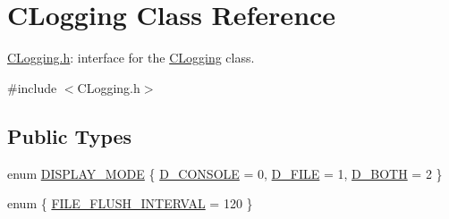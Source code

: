 \hypertarget{class_c_logging}{\section{\-C\-Logging \-Class \-Reference}
\label{class_c_logging}
}


\hyperlink{_c_logging_8h}{\-C\-Logging.\-h}\-: interface for the \hyperlink{class_c_logging}{\-C\-Logging} class.  




{\ttfamily \#include $<$\-C\-Logging.\-h$>$}

\subsection*{\-Public \-Types}
\begin{DoxyCompactItemize}
\item 
enum \hyperlink{class_c_logging_ac88f172cb4d0a2643a15fe21d4d20910}{\-D\-I\-S\-P\-L\-A\-Y\-\_\-\-M\-O\-D\-E} \{ \hyperlink{class_c_logging_ac88f172cb4d0a2643a15fe21d4d20910ab1d199061ee54e16ee5714cda8f88c07}{\-D\-\_\-\-C\-O\-N\-S\-O\-L\-E} =  0, 
\hyperlink{class_c_logging_ac88f172cb4d0a2643a15fe21d4d20910a368e59082c2e07a66ffb7abc710ac3fe}{\-D\-\_\-\-F\-I\-L\-E} =  1, 
\hyperlink{class_c_logging_ac88f172cb4d0a2643a15fe21d4d20910a17f9161030ee75067680a5b679598f59}{\-D\-\_\-\-B\-O\-T\-H} =  2
 \}
\item 
enum \{ \hyperlink{class_c_logging_ae762ada3dd0f62a8d5b371a97c87f33aa6d749f333928bfa35bc5343aa4b19650}{\-F\-I\-L\-E\-\_\-\-F\-L\-U\-S\-H\-\_\-\-I\-N\-T\-E\-R\-V\-A\-L} =  120
 \}
\end{DoxyCompactItemize}
